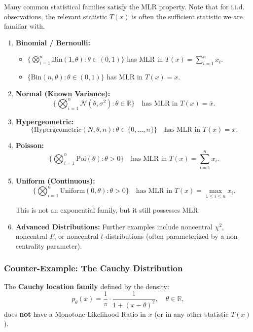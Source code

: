 \begin{ex}[]
    
\label{sec:mlr_examples}

Many common statistical families satisfy the MLR property. Note that for i.i.d. observations, the relevant statistic $T(x)$ is often the sufficient statistic we are familiar with.

\begin{enumerate}
    \item \textbf{Binomial / Bernoulli:}
    \begin{itemize}
        \item $\{\bigotimes_{i=1}^{n} \text{Bin}(1,\theta) : \theta \in (0,1)\}$ has MLR in $T(x) = \sum\limits_{i=1}^{n} x_i$.
        \item $\{\text{Bin}(n,\theta) : \theta \in (0,1)\}$ has MLR in $T(x) = x$.
    \end{itemize}

    \item \textbf{Normal (Known Variance):}
    \[ \{\bigotimes_{i=1}^{n} \mathcal{N}(\theta, \sigma^{2}) : \theta \in \mathbb{R}\} \quad \text{has MLR in } T(x) = \overline{x}. \]
    
    \item \textbf{Hypergeometric:}
    \[ \{\text{Hypergeometric}(N, \theta, n) : \theta \in \{0, ..., n\}\} \quad \text{has MLR in } T(x) = x. \]

    \item \textbf{Poisson:}
    \[ \{\bigotimes_{i=1}^n \text{Poi}(\theta) : \theta > 0\} \quad \text{has MLR in } T(x) = \sum_{i=1}^n x_i. \]

    \item \textbf{Uniform (Continuous):}
    \[ \{\bigotimes_{i=1}^n \text{Uniform}(0,\theta) : \theta > 0\} \quad \text{has MLR in } T(x) = \max_{1 \le i \le n} x_i. \]
    \begin{remark}[]
    This is not an exponential family, but it still possesses MLR.
    \end{remark}

    \item \textbf{Advanced Distributions:}
    Further examples include noncentral $\chi^2$, noncentral $F$, or noncentral $t$-distributions (often parameterized by a non-centrality parameter).
\end{enumerate}
\end{ex}

\subsubsection{Counter-Example: The Cauchy Distribution}
The \textbf{Cauchy location family} defined by the density:
\[ p_{\theta}(x) = \frac{1}{\pi} \cdot \frac{1}{1 + (x - \theta)^2}, \quad \theta \in \mathbb{R}, \]
does \textbf{not} have a Monotone Likelihood Ratio in $x$ (or in any other statistic $T(x)$).

